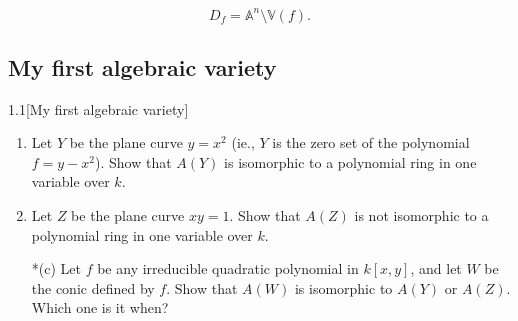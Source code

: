 \[D_f=\mathbb{A}^{n} \setminus \mathbb{V}(f).\]

\subsection{My first algebraic variety}

\begin{manualexercise}{1.1}[My first algebraic variety]
	\begin{enumerate}[label*=(\alph*)]\leavevmode
		\item Let $Y$ be the plane curve $y=x^2$ (ie., $Y$ is the zero set of the polynomial $f=y-x^2$). Show that $A(Y)$ is isomorphic to a polynomial ring in one variable over $k$.
		\item Let $Z$ be the plane curve $xy=1$. Show that $A(Z)$ is not isomorphic to a polynomial ring in one variable over $k$.
		\item[*(c)] Let $f$ be any irreducible quadratic polynomial in $k[x,y]$, and let $W$ be the conic defined by $f$. Show that $A(W)$ is isomorphic to $A(Y)$ or $A(Z)$. Which one is it when?
	\end{enumerate}
\end{manualexercise}

